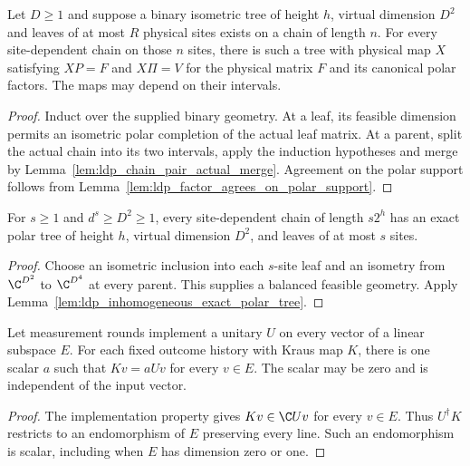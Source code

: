 \begin{lemma}
    \label{lem:ldp_inhomogeneous_exact_polar_tree}
    \leanok
    Let $D\ge1$ and suppose a binary isometric tree of height $h$,
    virtual dimension $D^2$ and leaves of at most $R$ physical sites exists
    on a chain of length $n$. For every site-dependent chain on those
    $n$ sites, there is such a tree with physical map $X$ satisfying
    $XP=F$ and $X\Pi=V$ for the physical matrix $F$ and its canonical
    polar factors. The maps may depend on their intervals.
\end{lemma}
\begin{proof}\leanok
    Induct over the supplied binary geometry. At a leaf, its feasible
    dimension permits an isometric polar completion of the actual leaf
    matrix. At a parent, split the actual chain into its two intervals,
    apply the induction hypotheses and merge by
    Lemma~\ref{lem:ldp_chain_pair_actual_merge}. Agreement on the polar
    support follows from Lemma~\ref{lem:ldp_factor_agrees_on_polar_support}.
\end{proof}

\begin{lemma}
    \label{lem:ldp_balanced_inhomogeneous_polar_tree}
    \leanok
    For $s\ge1$ and $d^s\ge D^2\ge1$, every site-dependent chain of
    length $s2^h$ has an exact polar tree of height $h$, virtual dimension
    $D^2$, and leaves of at most $s$ sites.
\end{lemma}
\begin{proof}\leanok
    Choose an isometric inclusion into each $s$-site leaf and an
    isometry from $\C^{D^2}$ to $\C^{D^4}$ at every parent. This supplies
    a balanced feasible geometry. Apply
    Lemma~\ref{lem:ldp_inhomogeneous_exact_polar_tree}.
\end{proof}

\begin{lemma}
    \label{lem:ldp_history_scalar}
    \leanok
    Let measurement rounds implement a unitary $U$ on every vector of a
    linear subspace $E$. For each fixed outcome history with Kraus map
    $K$, there is one scalar $a$ such that $Kv=aUv$ for every $v\in E$.
    The scalar may be zero and is independent of the input vector.
\end{lemma}
\begin{proof}\leanok
    The implementation property gives $Kv\in\C Uv$ for every $v\in E$.
    Thus $U^\dagger K$ restricts to an endomorphism of $E$ preserving
    every line. Such an endomorphism is scalar, including when $E$ has
    dimension zero or one.
\end{proof}


